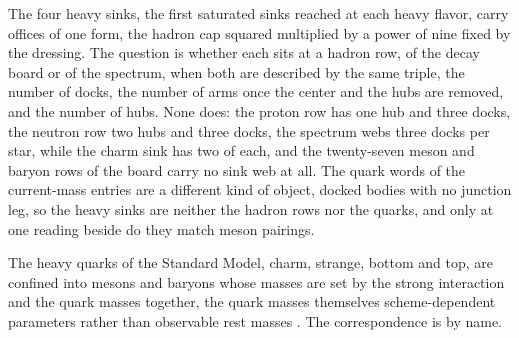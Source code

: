 The four heavy sinks, the first saturated sinks reached at each heavy flavor, carry offices of one form, the hadron cap squared multiplied by a power of nine fixed by the dressing. The question is whether each sits at a hadron row, of the decay board or of the spectrum, when both are described by the same triple, the number of docks, the number of arms once the center and the hubs are removed, and the number of hubs. None does: the proton row has one hub and three docks, the neutron row two hubs and three docks, the spectrum webs three docks per star, while the charm sink has two of each, and the twenty-seven meson and baryon rows of the board carry no sink web at all. The quark words of the current-mass entries are a different kind of object, docked bodies with no junction leg, so the heavy sinks are neither the hadron rows nor the quarks, and only at one reading beside do they match meson pairings.
\begin{chbridge}
The heavy quarks of the Standard Model, charm, strange, bottom and top, are confined into mesons and baryons whose masses are set by the strong interaction and the quark masses together, the quark masses themselves scheme-dependent parameters rather than observable rest masses \cite{Gasser1982,Peskin1995}. The correspondence is by name.
\end{chbridge}
